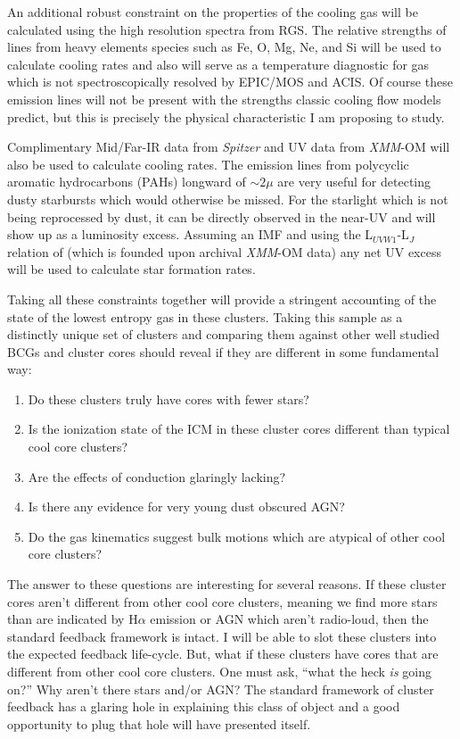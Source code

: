 \documentclass[11pt]{article}
\begin{document}
An additional robust constraint on the properties of the cooling gas
will be calculated using the high resolution spectra from RGS. The
relative strengths of lines from heavy elements species such as Fe, O,
Mg, Ne, and Si will be used to calculate cooling rates and also will
serve as a temperature diagnostic for gas which is not
spectroscopically resolved by EPIC/MOS and ACIS. Of course these
emission lines will not be present with the strengths classic cooling
flow models predict, but this is precisely the physical characteristic
I am proposing to study.

Complimentary Mid/Far-IR data from {\it Spitzer} and UV data from {\it
XMM}-OM will also be used to calculate cooling rates. The emission
lines from polycyclic aromatic hydrocarbons (PAHs) longward of
$\sim2\mu$ are very useful for detecting dusty starbursts which
would otherwise be missed. For the starlight which is not being
reprocessed by dust, it can be directly observed in the near-UV and
will show up as a luminosity excess. Assuming an IMF and using the
L$_{UVW1}$-L$_J$ relation of \cite{2005ApJ...635L...9H} (which is
founded upon archival {\it XMM}-OM data) any net UV excess will be
used to calculate star formation rates.

Taking all these constraints together will provide a stringent
accounting of the state of the lowest entropy gas in these
clusters. Taking this sample as a distinctly unique set of clusters
and comparing them against other well studied BCGs and cluster cores
should reveal if they are different in some fundamental way:
\begin{enumerate}
\item Do these clusters truly have cores with fewer stars?
\item Is the ionization state of the ICM in these cluster cores
different than typical cool core clusters?
\item Are the effects of conduction glaringly lacking?
\item Is there any evidence for very young dust obscured AGN?
\item Do the gas kinematics suggest bulk motions which are atypical of
other cool core clusters?
\end{enumerate}
The answer to these questions are interesting for several reasons.
If these cluster cores aren't different from other cool core clusters,
meaning we find more stars than are indicated by H$\alpha$ emission or
AGN which aren't radio-loud, then the standard feedback framework is
intact. I will be able to slot these clusters into the expected
feedback life-cycle. But, what if these clusters have cores that are
different from other cool core clusters. One must ask, ``what the heck
{\it is} going on?''  Why aren't there stars and/or AGN? The standard
framework of cluster feedback has a glaring hole in explaining this
class of object and a good opportunity to plug that hole will have
presented itself.
\end{document}
